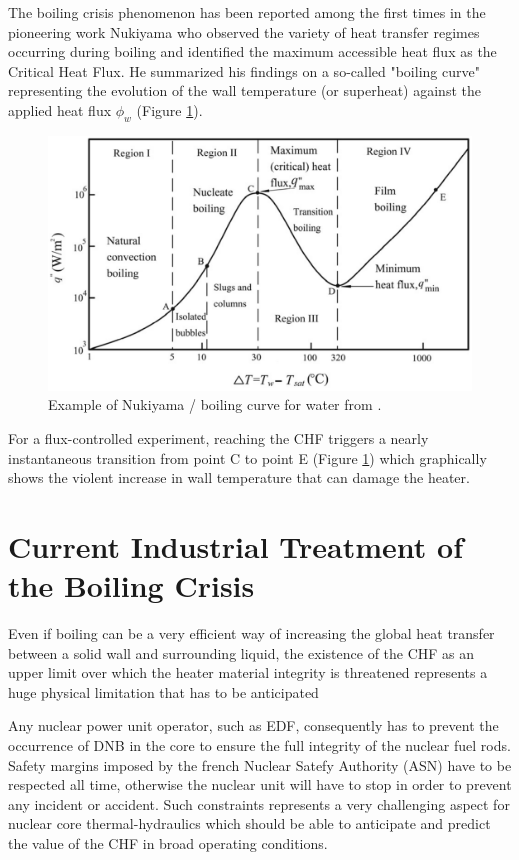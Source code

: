 The boiling crisis phenomenon has been reported among the first times in the pioneering work Nukiyama \cite{nukiyama_1936} who observed the variety of heat transfer regimes occurring during boiling and identified the maximum accessible heat flux as the Critical Heat Flux. He summarized his findings on a so-called "boiling curve" representing the evolution of the wall temperature (or superheat) against the applied heat flux $\phi_{w}$ (Figure \ref{fig:nukiyama_curve}).

\begin{figure}[!h]
\centering
\includegraphics[width=0.7\linewidth]{img/intro/nukiyama.png}
\caption{Example of Nukiyama / boiling curve for water from \cite{fahri_2006}.}
\label{fig:nukiyama_curve}
\end{figure}


\npar

For a flux-controlled experiment, reaching the CHF triggers a nearly instantaneous transition from point C to point E (Figure \ref{fig:nukiyama_curve}) which graphically shows the violent increase in wall temperature that can damage the heater.


\section{Current Industrial Treatment of the Boiling Crisis}

Even if boiling can be a very efficient way of increasing the global heat transfer between a solid wall and surrounding liquid, the existence of the CHF as an upper limit over which the heater material integrity is threatened represents a huge physical limitation that has to be anticipated

\npar

Any nuclear power unit operator, such as EDF, consequently has to prevent the occurrence of DNB in the core to ensure the full integrity of the nuclear fuel rods. Safety margins imposed by the french Nuclear Satefy Authority (ASN) have to be respected all time, otherwise the nuclear unit will have to stop in order to prevent any incident or accident. Such constraints represents a very challenging aspect for nuclear core thermal-hydraulics which should be able to anticipate and predict the value of the CHF in broad operating conditions.

